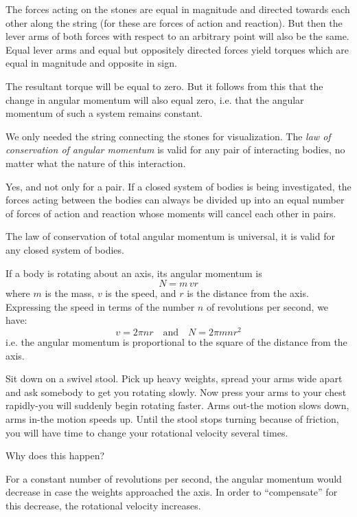 The forces acting on the stones are equal in magnitude
and directed towards each other along the string (for
these are forces of action and reaction). But then the
lever arms of both forces with respect to an arbitrary point
will also be the same. Equal lever arms and equal but
oppositely directed forces yield torques which are equal
in magnitude and opposite in sign.

The resultant torque will be equal to zero. But it follows from this that the change in angular momentum will
also equal zero, i.e. that the angular momentum of such
a system remains constant.

We only needed the string connecting the stones for visualization. The \emph{law of conservation of angular momentum} is valid for any pair of interacting bodies, no matter what the nature of this interaction.

Yes, and not only for a pair. If a closed system of bodies is being investigated, the forces acting between the bodies can always be divided up into an equal number of forces of action and reaction whose moments will cancel each other in pairs.

The law of conservation of total angular momentum is universal, it is valid for any closed system of bodies.

If a body is rotating about an axis, its angular momentum is
 \begin{equation*}%
N = m \, vr
 \end{equation*}
where $m$ is the mass, $v$ is the speed, and $r$ is the distance from the axis. Expressing the speed in terms of the number $n$ of revolutions per second, we have:
 \begin{equation*}%
v = 2 \pi nr \quad \textrm{and} \quad N = 2 \pi mnr^{2}
 \end{equation*}
i.e. the angular momentum is proportional to the square
of the distance from the axis.

Sit down on a swivel stool. Pick up heavy weights, spread your arms wide apart and ask somebody to get you rotating slowly. Now press your arms to your chest rapidly-you will suddenly begin rotating faster. Arms out-the motion slows down, arms in-the motion speeds up. Until the stool stops turning because of friction, you will have time to change your rotational velocity several times.

Why does this happen?

For a constant number of revolutions per second, the angular momentum would decrease in case the weights approached the axis. In order to ``compensate'' for this decrease, the rotational velocity increases.


